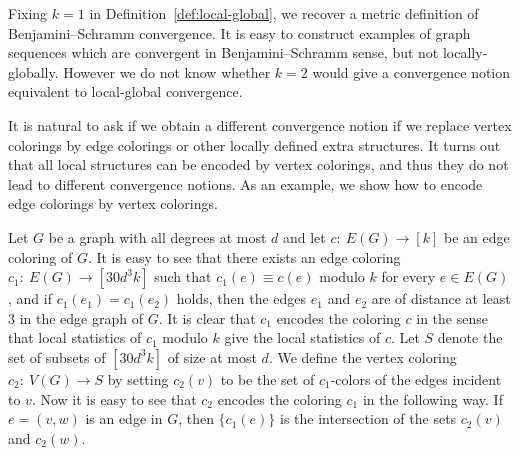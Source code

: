 \documentclass{article}
\newcommand{\ignore}[1]{}
\begin{document}
\ignore{We can also define local-global convergence through
appropriate metrics. Let $G_1$ and $G_2$ be two finite graphs. First,
for a fixed depth $r\ge 1$ and number of colors $k\ge1$ we define
$d_\text{\rm sample}^{(r,k)}(G_1,G_2)$ as the infimum of all numbers
$a>0$ such that for every $k$-coloring $c_1$ of $V(G_1)$ there exists
a $k$-coloring $c_2$ of $V(G_2)$ such that $d_\text{\rm
var}\bigl(P_{G_1,r}[c_1], P_{G_2,r}[c_2]\bigr)\le a$, and vice versa.
We then define the \emph{nondeterministic sampling distance} as a
weighted average of these numbers:
\[
d_\text{\rm nd}(G_1,G_2) = \sum_{k=1}^\infty \sum_{r=1}^\infty
\frac{1}{2^{r+k}} d^{(r,k)}_\text{\rm sample}(G_1,G_2).
\]
It is easy to see that this defines a metric on finite graphs, and a
sequence is local-global convergent if and only if it is Cauchy in
this metric.}

Fixing $k=1$ in Definition~\ref{def:local-global}, we recover a
metric definition of Benjamini--Schramm convergence. It is easy to
construct examples of graph sequences  which are convergent in
Benjamini--Schramm  sense, but not locally-globally. However we do
not know whether $k=2$ would give a convergence notion equivalent to
local-global convergence.

It is natural to ask if we obtain a different convergence notion if
we replace vertex colorings by edge colorings or other locally
defined extra structures. It turns out that all local structures can
be encoded by vertex colorings, and thus they do not lead to
different convergence notions. As an example, we show how to encode
edge colorings by vertex colorings.

Let $G$ be a graph with all degrees at most $d$ and let
$c:~E(G)\rightarrow [k]$ be an edge coloring of $G$. It is easy to
see that there exists an edge coloring $c_1:~E(G)\rightarrow
[30d^3k]$ such that $c_1(e)\equiv c(e)$ modulo $k$ for every $e\in
E(G)$, and  if $c_1(e_1)=c_1(e_2)$ holds, then the edges $e_1$ and
$e_2$ are of distance at least $3$ in the edge graph of $G$. It is
clear that $c_1$ encodes the coloring $c$ in the sense that local
statistics of $c_1$ modulo $k$ give the local statistics of $c$. Let
$S$ denote the set of subsets of $[30d^3k]$ of size at most $d$. We
define the vertex coloring $c_2:~V(G)\rightarrow S$ by setting
$c_2(v)$ to be the set of $c_1$-colors of the edges incident to $v$.
Now it is easy to see that $c_2$ encodes the coloring $c_1$ in the
following way. If $e=(v,w)$ is an edge in $G$, then {$\{c_1(e)\}$} is
the intersection of the sets $c_2(v)$ and $c_2(w)$.
\end{document}
